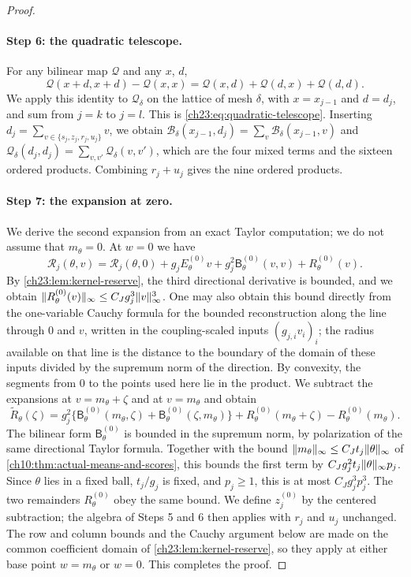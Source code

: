 \begin{proof}
\paragraph{Step 6: the quadratic telescope.}
For any bilinear map $\mathcal Q$ and any $x$, $d$,
\[
 \mathcal Q(x+d,x+d)-\mathcal Q(x,x)=\mathcal Q(x,d)+\mathcal Q(d,x)+\mathcal Q(d,d).
\]
We apply this identity to $\mathcal Q_\delta$ on the lattice of mesh $\delta$, with $x=x_{j-1}$ and $d=d_j$, and sum from $j=k$ to $j=l$. This is \eqref{ch23:eq:quadratic-telescope}. Inserting $d_j=\sum_{v\in\{s_j,z_j,r_j,u_j\}}v$, we obtain $\mathcal B_\delta(x_{j-1},d_j)=\sum_v\mathcal B_\delta(x_{j-1},v)$ and $\mathcal Q_\delta(d_j,d_j)=\sum_{v,v'}\mathcal Q_\delta(v,v')$, which are the four mixed terms and the sixteen ordered products. Combining $r_j+u_j$ gives the nine ordered products.

\paragraph{Step 7: the expansion at zero.}
We derive the second expansion from an exact Taylor computation; we do not assume that $m_\theta=0$. At $w=0$ we have
\[
 \mathscr R_j(\theta,v)=\mathscr R_j(\theta,0)+g_jE_\theta^{(0)}v+g_j^2\mathsf B_\theta^{(0)}(v,v)+R_\theta^{(0)}(v).
\]
By \cref{ch23:lem:kernel-reserve}, the third directional derivative is bounded, and we obtain $\lVert R_\theta^{(0)}(v)\rVert_\infty\le C_Jg_j^3\lVert v\rVert_\infty^3$. One may also obtain this bound directly from the one-variable Cauchy formula for the bounded reconstruction along the line through $0$ and $v$, written in the coupling-scaled inputs $(g_{j,i}v_i)_i$; the radius available on that line is the distance to the boundary of the domain of these inputs divided by the supremum norm of the direction. By convexity, the segments from $0$ to the points used here lie in the product. We subtract the expansions at $v=m_\theta+\zeta$ and at $v=m_\theta$ and obtain
\[
 \widetilde R_\theta(\zeta)
 =g_j^2\bigl\{\mathsf B_\theta^{(0)}(m_\theta,\zeta)+\mathsf B_\theta^{(0)}(\zeta,m_\theta)\bigr\}
 +R_\theta^{(0)}(m_\theta+\zeta)-R_\theta^{(0)}(m_\theta).
\]
The bilinear form $\mathsf B_\theta^{(0)}$ is bounded in the supremum norm, by polarization of the same directional Taylor formula. Together with the bound $\lVert m_\theta\rVert_\infty\le C_Jt_j\lVert \theta\rVert_\infty$ of \cref{ch10:thm:actual-means-and-scores}, this bounds the first term by $C_Jg_j^2t_j\lVert \theta\rVert_\infty p_j$. Since $\theta$ lies in a fixed ball, $t_j/g_j$ is fixed, and $p_j\ge1$, this is at most $C_Jg_j^3p_j^3$. The two remainders $R_\theta^{(0)}$ obey the same bound. We define $z_j^{(0)}$ by the centered subtraction; the algebra of Steps 5 and 6 then applies with $r_j$ and $u_j$ unchanged. The row and column bounds and the Cauchy argument below are made on the common coefficient domain of \cref{ch23:lem:kernel-reserve}, so they apply at either base point $w=m_\theta$ or $w=0$. This completes the proof.
\end{proof}

